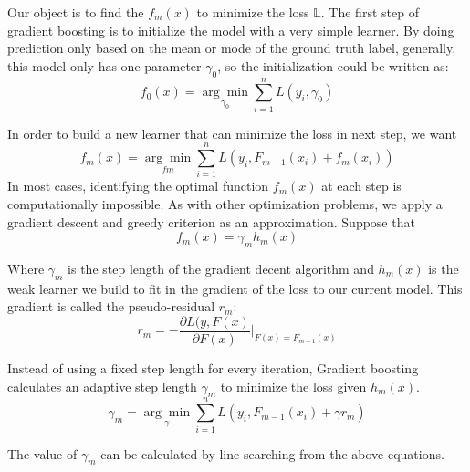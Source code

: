 \documentclass[10pt,twocolumn,letterpaper]{article}
\begin{document}
Our object is to find the $f_m(x)$ to minimize the loss $\mathbb {L}$. 
The first step of gradient boosting is to initialize the model with a very simple learner. By doing prediction only based on the mean or mode of the ground truth label, generally, this model only has one parameter $\gamma_0$, so the initialization could be written as:
\begin{equation}f_0(x) = \underset{\gamma_0}{\arg\min} \sum_{i=1}^n L(y_i, \gamma_0) \end{equation}

In order to build a new learner that can minimize the loss in next step, we want
\begin{equation}
f_m(x) = \underset{fm}{\arg\min} \sum_{i=1}^n L(y_i, F_{m-1}(x_i)+f_m(x_i))
\end{equation}
In most cases, identifying the optimal function $f_m(x)$ at each step is computationally impossible. As with other optimization problems, we apply a gradient descent and greedy criterion as an approximation. Suppose that
\begin{equation}
f_m(x) = \gamma_m h_m(x)
\end{equation}

Where $\gamma_m$ is the step length of the gradient decent algorithm and $h_m(x)$ is the weak learner we build to fit in the gradient of the loss to our current model. This gradient is called the pseudo-residual $r_m$:
\begin{equation}
r_m = -\frac{\partial L(y,F(x)}{\partial F(x)} |_{F(x)=F_{m-1}(x)} 
\end{equation}

Instead of using a fixed step length for every iteration, Gradient boosting calculates an adaptive step length $\gamma_m$ to minimize the loss given $h_m(x)$.
\begin{equation}
\gamma_m = \underset{\gamma}{\arg\min} \sum_{i=1}^n L(y_i,F_{m-1}(x_i)+\gamma r_m)
\end{equation}

The value of $\gamma_m$ can be calculated by line searching from the above equations.
\end{document}
